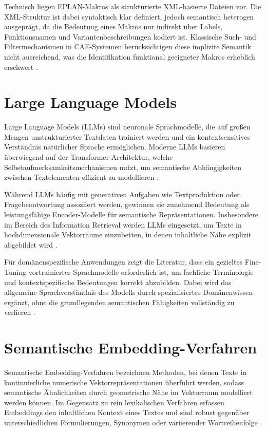 Technisch liegen EPLAN-Makros als strukturierte XML-basierte Dateien vor. Die XML-Struktur ist dabei syntaktisch klar definiert, jedoch semantisch heterogen ausgeprägt, da die Bedeutung eines Makros nur indirekt über Labels, Funktionsnamen und Variantenbeschreibungen kodiert ist. Klassische Such- und Filtermechanismen in CAE-Systemen berücksichtigen diese implizite Semantik nicht ausreichend, was die Identifikation funktional geeigneter Makros erheblich erschwert \cite{tekli_hybrid_2007,xmlComparingSchemata}.

\section{Large Language Models}

Large Language Models (LLMs) sind neuronale Sprachmodelle, die auf großen Mengen unstrukturierter Textdaten trainiert werden und ein kontextsensitives Verständnis natürlicher Sprache ermöglichen. Moderne LLMs basieren überwiegend auf der Transformer-Architektur, welche Selbstaufmerksamkeitsmechanismen nutzt, um semantische Abhängigkeiten zwischen Textelementen effizient zu modellieren \cite{parthasarathy_ultimate_2024}.

Während LLMs häufig mit generativen Aufgaben wie Textproduktion oder Fragebeantwortung assoziiert werden, gewinnen sie zunehmend Bedeutung als leistungsfähige Encoder-Modelle für semantische Repräsentationen. Insbesondere im Bereich des Information Retrieval werden LLMs eingesetzt, um Texte in hochdimensionale Vektorräume einzubetten, in denen inhaltliche Nähe explizit abgebildet wird \cite{tao_llms_2025}.

Für domänenspezifische Anwendungen zeigt die Literatur, dass ein gezieltes Fine-Tuning vortrainierter Sprachmodelle erforderlich ist, um fachliche Terminologie und kontextspezifische Bedeutungen korrekt abzubilden. Dabei wird das allgemeine Sprachverständnis des Modells durch spezialisiertes Domänenwissen ergänzt, ohne die grundlegenden semantischen Fähigkeiten vollständig zu verlieren \cite{bansal_refining_2025}.

\section{Semantische Embedding-Verfahren}

Semantische Embedding-Verfahren bezeichnen Methoden, bei denen Texte in kontinuierliche numerische Vektorrepräsentationen überführt werden, sodass semantische Ähnlichkeiten durch geometrische Nähe im Vektorraum modelliert werden können. Im Gegensatz zu rein lexikalischen Verfahren erfassen Embeddings den inhaltlichen Kontext eines Textes und sind robust gegenüber unterschiedlichen Formulierungen, Synonymen oder variierender Wortreihenfolge \cite{tao_llms_2025}.

